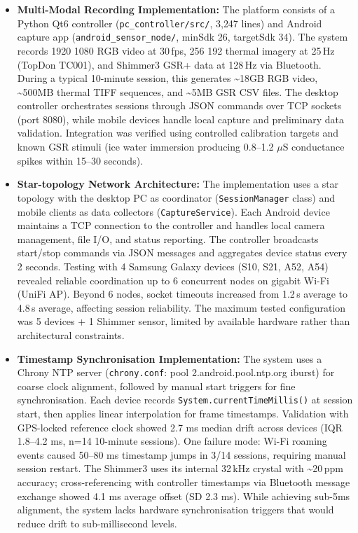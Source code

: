 \begin{itemize}
    \item \textbf{Multi-Modal Recording Implementation:} The platform consists of a Python Qt6 controller (\texttt{pc\_controller/src/}, 3{,}247 lines) and Android capture app (\texttt{android\_sensor\_node/}, minSdk 26, targetSdk 34). The system records 1920\,\texttimes\,1080 RGB video at 30\,fps, 256\,\texttimes\,192 thermal imagery at 25\,Hz (TopDon TC001), and Shimmer3 GSR+ data at 128\,Hz via Bluetooth. During a typical 10-minute session, this generates \textasciitilde{}18GB RGB video, \textasciitilde{}500MB thermal TIFF sequences, and \textasciitilde{}5MB GSR CSV files. The desktop controller orchestrates sessions through JSON commands over TCP sockets (port 8080), while mobile devices handle local capture and preliminary data validation. Integration was verified using controlled calibration targets and known GSR stimuli (ice water immersion producing 0.8--1.2 $\mu$S conductance spikes within 15--30 seconds).
    \item \textbf{Star-topology Network Architecture:} The implementation uses a star topology with the desktop PC as coordinator (\texttt{SessionManager} class) and mobile clients as data collectors (\texttt{CaptureService}). Each Android device maintains a TCP connection to the controller and handles local camera management, file I/O, and status reporting. The controller broadcasts start/stop commands via JSON messages and aggregates device status every 2 seconds. Testing with 4 Samsung Galaxy devices (S10, S21, A52, A54) revealed reliable coordination up to 6 concurrent nodes on gigabit Wi-Fi (UniFi AP). Beyond 6 nodes, socket timeouts increased from 1.2\,s average to 4.8\,s average, affecting session reliability. The maximum tested configuration was 5 devices + 1 Shimmer sensor, limited by available hardware rather than architectural constraints.
    \item \textbf{Timestamp Synchronisation Implementation:} The system uses a Chrony NTP server (\texttt{chrony.conf}: pool 2.android.pool.ntp.org iburst) for coarse clock alignment, followed by manual start triggers for fine synchronisation. Each device records \texttt{System.currentTimeMillis()} at session start, then applies linear interpolation for frame timestamps. Validation with GPS-locked reference clock showed 2.7 ms median drift across devices (IQR 1.8--4.2 ms, n=14 10-minute sessions). One failure mode: Wi-Fi roaming events caused 50--80 ms timestamp jumps in 3/14 sessions, requiring manual session restart. The Shimmer3 uses its internal 32\,kHz crystal with \textasciitilde{}\textpm{}20\,ppm accuracy; cross-referencing with controller timestamps via Bluetooth message exchange showed 4.1 ms average offset (SD 2.3 ms). While achieving sub-5ms alignment, the system lacks hardware synchronisation triggers that would reduce drift to sub-millisecond levels.

\end{itemize}
